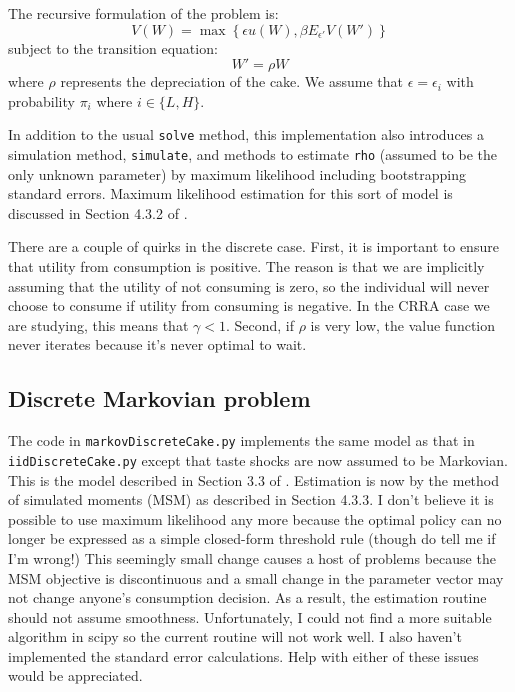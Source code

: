 The recursive formulation of the problem is:
\begin{equation}
	V(W) = \max \left\{\epsilon u(W), \beta E_{\epsilon'} V(W') \right\}
\end{equation}
subject to the transition equation:
\begin{equation}
	W' = \rho W
\end{equation}
where \(\rho\) represents the depreciation of the cake. We assume that \(\epsilon = \epsilon_i\) with probability \(\pi_i\) where \(i \in \{L, H\}\).

In addition to the usual \texttt{solve} method, this implementation also introduces a simulation method, \texttt{simulate}, and methods to estimate \texttt{rho} (assumed to be the only unknown parameter) by maximum likelihood including bootstrapping standard errors. Maximum likelihood estimation for this sort of model is discussed in Section 4.3.2 of \citet{adda2003dynamic}.

There are a couple of quirks in the discrete case. First, it is important to ensure that utility from consumption is positive. The reason is that we are implicitly assuming that the utility of not consuming is zero, so the individual will never choose to consume if utility from consuming is negative. In the CRRA case we are studying, this means that \(\gamma < 1\). Second, if \(\rho\) is very low, the value function never iterates because it's never optimal to wait.


\subsection{Discrete Markovian problem}

The code in \texttt{markovDiscreteCake.py} implements the same model as that in \texttt{iidDiscreteCake.py} except that taste shocks are now assumed to be Markovian. This is the model described in Section 3.3 of \citet{adda2003dynamic}. Estimation is now by the method of simulated moments (MSM) as described in Section 4.3.3. I don't believe it is possible to use maximum likelihood any more because the optimal policy can no longer be expressed as a simple closed-form threshold rule (though do tell me if I'm wrong!) This seemingly small change causes a host of problems because the MSM objective is discontinuous and a small change in the parameter vector may not change anyone's consumption decision. As a result, the estimation routine should not assume smoothness. Unfortunately, I could not find a more suitable algorithm in scipy so the current routine will not work well. I also haven't implemented the standard error calculations. Help with either of these issues would be appreciated.


